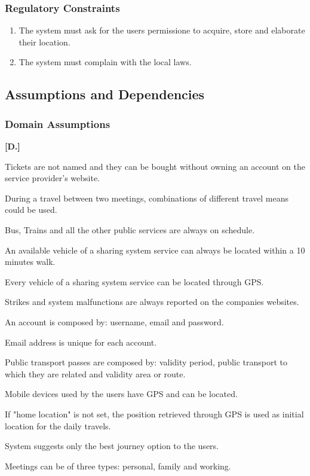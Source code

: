 \subsubsection{Regulatory Constraints}
\begin{enumerate}
\item
The system must ask for the users permissione to acquire, store and elaborate their location.
\item
The system must complain with the local laws.
\end{enumerate}

\subsection{Assumptions and Dependencies}
\subsubsection{Domain Assumptions}
\begin{list}
{\bfseries{}[D.]~}
{
}
\item
Tickets are not named and they can be bought without owning an account on the service provider's website.
\item
During a travel between two meetings, combinations of different travel means could be used.
\item
Bus, Trains and all the other public services are always on schedule.
\item
An available vehicle of a sharing system service can always be located within a 10 minutes walk.
\item
Every vehicle of a sharing system service can be located through GPS.
\item
Strikes and system malfunctions are always reported on the companies websites.
\item
An account is composed by: username, email and password.
\item
Email address is unique for each account.
\item
Public transport passes are composed by: validity period, public transport to which they are related and validity area or route.
\item
Mobile devices used by the users have GPS and can be located.
\item
If "home location" is not set, the position retrieved through GPS is used as initial location for the daily travels.
\item
System suggests only the best journey option to the users.
\item
Meetings can be of three types: personal, family and working.
\end{list}